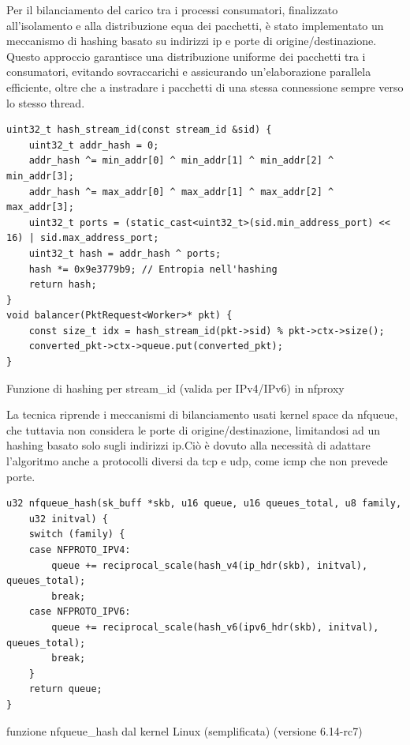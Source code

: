 Per il bilanciamento del carico tra i processi consumatori, finalizzato all'isolamento e alla distribuzione equa dei pacchetti, è stato implementato un meccanismo di hashing basato su indirizzi \gls{ip} e porte di origine/destinazione. Questo approccio garantisce una distribuzione uniforme dei pacchetti tra i consumatori, evitando sovraccarichi e assicurando un'elaborazione parallela efficiente, oltre che a instradare i pacchetti di una stessa connessione sempre verso lo stesso thread.

\begin{listing}[H]
\begin{verbatim}
uint32_t hash_stream_id(const stream_id &sid) {
    uint32_t addr_hash = 0;
    addr_hash ^= min_addr[0] ^ min_addr[1] ^ min_addr[2] ^ min_addr[3];
    addr_hash ^= max_addr[0] ^ max_addr[1] ^ max_addr[2] ^ max_addr[3];
    uint32_t ports = (static_cast<uint32_t>(sid.min_address_port) << 16) | sid.max_address_port;
    uint32_t hash = addr_hash ^ ports;
    hash *= 0x9e3779b9; // Entropia nell'hashing
    return hash;
}
void balancer(PktRequest<Worker>* pkt) {
    const size_t idx = hash_stream_id(pkt->sid) % pkt->ctx->size();
    converted_pkt->ctx->queue.put(converted_pkt);
}
\end{verbatim}
\vspace{-1em}
\caption{Funzione di hashing per stream\_id (valida per IPv4/IPv6) in \gls{nfproxy}}\label{lst:nfproxy_hash}
\end{listing}

La tecnica riprende i meccanismi di bilanciamento usati kernel space da \gls{nfqueue}, che tuttavia non considera le porte di origine/destinazione,
limitandosi ad un hashing basato solo sugli indirizzi \gls{ip}.\@ Ciò è dovuto alla necessità di adattare l'algoritmo anche a protocolli diversi da \gls{tcp} e \gls{udp}, come \gls{icmp} che non prevede porte.

\begin{listing}[H]
\begin{verbatim}
u32 nfqueue_hash(sk_buff *skb, u16 queue, u16 queues_total, u8 family,
    u32 initval) {
    switch (family) {
    case NFPROTO_IPV4:
        queue += reciprocal_scale(hash_v4(ip_hdr(skb), initval), queues_total);
        break;
    case NFPROTO_IPV6:
        queue += reciprocal_scale(hash_v6(ipv6_hdr(skb), initval), queues_total);
        break;
    }
    return queue;
}
\end{verbatim}
\vspace{-1em}
\caption{funzione nfqueue\_hash dal kernel Linux (semplificata) (versione 6.14-rc7)}\label{lst:nfqueue_hash_linux}
\end{listing}

